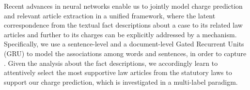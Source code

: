 Recent advances in neural networks enable us to jointly model charge prediction and relevant 
article extraction in a unified framework, %
where the latent correspondence from the textual fact descriptions about a case to its related law articles 
and further to its charges can be explicitly addressed by a  mechanism.
Specifically,   %
we use a sentence-level and a document-level Gated Recurrent Units (GRU)  to model the associations among words and sentences, in order to capture .  
Given the analysis about the fact descriptions, we accordingly learn to attentively select the most supportive law articles from the statutory laws  to support our charge prediction, which is investigated in a multi-label paradigm.

